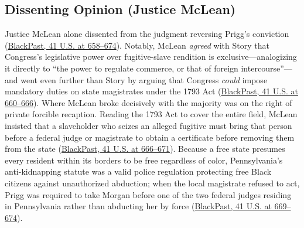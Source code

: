\documentclass[12pt]{article}
\begin{document}
\subsection{Dissenting Opinion (Justice McLean)}
Justice McLean alone dissented from the judgment reversing Prigg's conviction (\href{https://blackpast.org/african-american-history/prigg-v-pennsylvania-1842/}{BlackPast, 41 U.S. at 658--674}). Notably, McLean \textit{agreed} with Story that Congress's legislative power over fugitive-slave rendition is exclusive---analogizing it directly to ``the power to regulate commerce, or that of foreign intercourse''---and went even further than Story by arguing that Congress \textit{could} impose mandatory duties on state magistrates under the 1793 Act (\href{https://blackpast.org/african-american-history/prigg-v-pennsylvania-1842/}{BlackPast, 41 U.S. at 660--666}). Where McLean broke decisively with the majority was on the right of private forcible recaption. Reading the 1793 Act to cover the entire field, McLean insisted that a slaveholder who seizes an alleged fugitive must bring that person before a federal judge or magistrate to obtain a certificate before removing them from the state (\href{https://blackpast.org/african-american-history/prigg-v-pennsylvania-1842/}{BlackPast, 41 U.S. at 666--671}). Because a free state presumes every resident within its borders to be free regardless of color, Pennsylvania's anti-kidnapping statute was a valid police regulation protecting free Black citizens against unauthorized abduction; when the local magistrate refused to act, Prigg was required to take Morgan before one of the two federal judges residing in Pennsylvania rather than abducting her by force (\href{https://blackpast.org/african-american-history/prigg-v-pennsylvania-1842/}{BlackPast, 41 U.S. at 669--674}).
\end{document}
